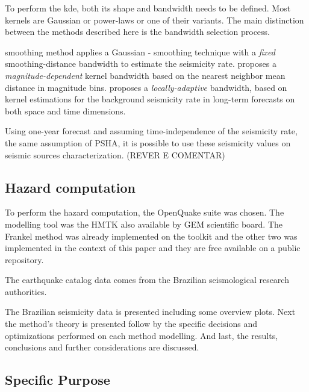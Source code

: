 \documentclass[draft, grl]{agutex}
\begin{document}
\begin{article}
To perform the \gls{kde}, both its shape and bandwidth needs to be defined. Most kernels are Gaussian or power-laws or one of their variants. The main distinction between the methods described here is the bandwidth selection process.

\citet{frankel_1995} smoothing method applies a Gaussian \citet{nadaraya_1964}-\citet{watson_1964} smoothing technique with a \emph{fixed} smoothing-distance bandwidth to estimate the seismicity rate. \citet{woo_1996} proposes a \emph{magnitude-dependent} kernel bandwidth based on the nearest neighbor mean distance in magnitude bins. \citet{helmstetter_2012} proposes a \emph{locally-adaptive} bandwidth, based on kernel estimations for the background seismicity rate in long-term forecasts on both space and time dimensions.

Using one-year forecast and assuming time-independence of the seismicity rate, the same assumption of PSHA, it is possible to use these seismicity values on seismic sources characterization. (REVER E COMENTAR)



\subsection{Hazard computation}

To perform the hazard computation, the OpenQuake suite was chosen. The modelling tool was the HMTK also available by GEM scientific board. The Frankel method was already implemented on the toolkit and the other two was implemented in the context of this paper and they are free available on a public repository.

The earthquake catalog data comes from the Brazilian seismological research authorities.

The Brazilian seismicity data is presented including some overview plots. Next the method's theory is presented follow by the specific decisions and optimizations performed on each method modelling. And last, the results, conclusions and further considerations are discussed.


\subsection{Specific Purpose}




%
%


\end{article}
\end{document}
